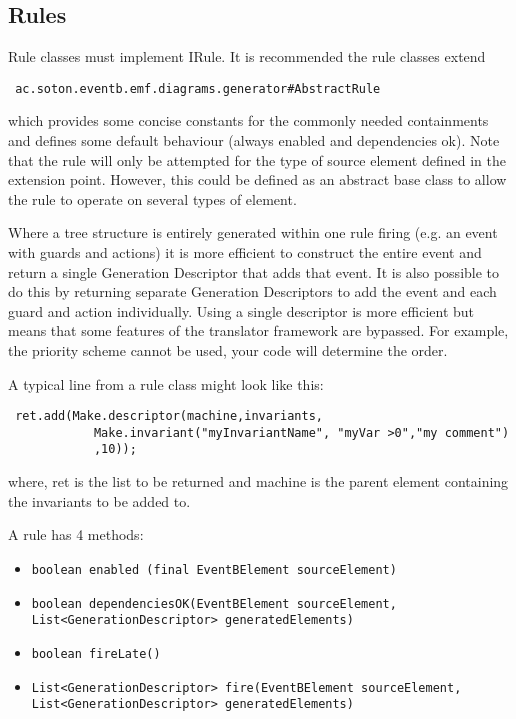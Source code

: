 \subsection{Rules}
\label{sec:rules}

Rule classes must implement IRule. It is recommended the rule classes extend
 \begin{verbatim}
 ac.soton.eventb.emf.diagrams.generator#AbstractRule
 \end{verbatim}
 which provides some concise constants for the commonly needed containments and defines some default behaviour (always enabled and dependencies ok).  Note that the rule will only be attempted for the type of source element defined in the extension point. However, this could be defined as an abstract base class to allow the rule to operate on several types of element.

Where a tree structure is entirely generated within one rule firing (e.g. an event with guards and actions) it is more efficient to construct the entire event and return a single Generation Descriptor that adds that event. It is also possible to do this by returning separate Generation Descriptors to add the event and each guard and action individually. Using a single descriptor is more efficient but means that some features of the translator framework are bypassed. For example, the priority scheme cannot be used, your code will determine the order. 

A typical line from a rule class might look like this:
 \begin{verbatim}
 ret.add(Make.descriptor(machine,invariants,
			Make.invariant("myInvariantName", "myVar >0","my comment")
			,10));
 \end{verbatim}		
where,  ret is the list to be returned and machine is the parent element containing the invariants to be added to.

A rule has 4 methods:
\begin{itemize}
\item \texttt{boolean enabled (final EventBElement sourceElement)}
\item \texttt{boolean dependenciesOK(EventBElement sourceElement, \\  List<GenerationDescriptor> generatedElements)}
\item \texttt{boolean fireLate()}
\item \texttt{List<GenerationDescriptor> fire(EventBElement sourceElement, \\   List<GenerationDescriptor> generatedElements)}
\end{itemize}

